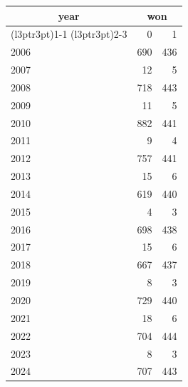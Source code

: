 \footnotesize\begin{tabular}[t]{lrr}
\toprule
\multicolumn{1}{c}{year} & \multicolumn{2}{c}{won} \\
\cmidrule(l{3pt}r{3pt}){1-1} \cmidrule(l{3pt}r{3pt}){2-3}
  & 0 & 1\\
\midrule
2006 & 690 & 436\\
2007 & 12 & 5\\
2008 & 718 & 443\\
2009 & 11 & 5\\
2010 & 882 & 441\\
2011 & 9 & 4\\
2012 & 757 & 441\\
2013 & 15 & 6\\
2014 & 619 & 440\\
2015 & 4 & 3\\
2016 & 698 & 438\\
2017 & 15 & 6\\
2018 & 667 & 437\\
2019 & 8 & 3\\
2020 & 729 & 440\\
2021 & 18 & 6\\
2022 & 704 & 444\\
2023 & 8 & 3\\
2024 & 707 & 443\\
\bottomrule
\end{tabular}
